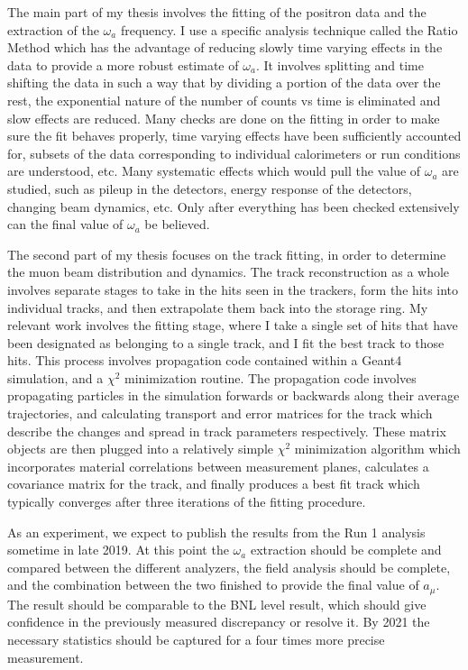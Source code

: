 \documentclass[12pt,letterpaper]{article}
\def\wa{$\omega_{a}$\xspace}
\def\chisq{$\chi^{2}$\xspace}
\def\amu{$a_{\mu}$\xspace}
\begin{document}
The main part of my thesis involves the fitting of the positron data and the extraction of the \wa frequency. I use a specific analysis technique called the Ratio Method which has the advantage of reducing slowly time varying effects in the data to provide a more robust estimate of \wa. It involves splitting and time shifting the data in such a way that by dividing a portion of the data over the rest, the exponential nature of the number of counts vs time is eliminated and slow effects are reduced. Many checks are done on the fitting in order to make sure the fit behaves properly, time varying effects have been sufficiently accounted for, subsets of the data corresponding to individual calorimeters or run conditions are understood, etc. Many systematic effects which would pull the value of \wa are studied, such as pileup in the detectors, energy response of the detectors, changing beam dynamics, etc. Only after everything has been checked extensively can the final value of \wa be believed. 


The second part of my thesis focuses on the track fitting, in order to determine the muon beam distribution and dynamics. The track reconstruction as a whole involves separate stages to take in the hits seen in the trackers, form the hits into individual tracks, and then extrapolate them back into the storage ring. My relevant work involves the fitting stage, where I take a single set of hits that have been designated as belonging to a single track, and I fit the best track to those hits. This process involves propagation code contained within a Geant4 simulation, and a \chisq minimization routine. The propagation code involves propagating particles in the simulation forwards or backwards along their average trajectories, and calculating transport and error matrices for the track which describe the changes and spread in track parameters respectively. These matrix objects are then plugged into a relatively simple \chisq minimization algorithm which incorporates material correlations between measurement planes, calculates a covariance matrix for the track, and finally produces a best fit track which typically converges after three iterations of the fitting procedure.


As an experiment, we expect to publish the results from the Run 1 analysis sometime in late 2019. At this point the \wa extraction should be complete and compared between the different analyzers, the field analysis should be complete, and the combination between the two finished to provide the final value of \amu. The result should be comparable to the BNL level result, which should give confidence in the previously measured discrepancy or resolve it. By 2021 the necessary statistics should be captured for a four times more precise measurement.
\end{document}
